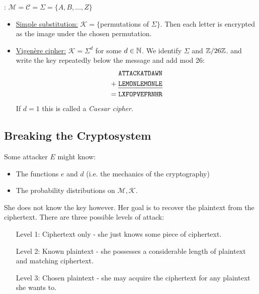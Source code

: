 \documentclass[10pt,a4paper]{article}
\begin{document}
: $\mathcal{M}=\mathcal{C} = \Sigma=\{A, B, \ldots, Z\}$
\begin{itemize}
\item \underline{Simple substitution:} $\mathcal{K} = \{$permutations of $\Sigma\}$. Then each letter is encrypted as the image under the chosen permutation.
\item \underline{Vigen\`{e}re cipher:} $\mathcal{K} = \Sigma^d$ for some $d \in \mathbb{N}$. We identify $\Sigma$ and $\mathbb{Z}/26\mathbb{Z}$. and write the key repeatedly below the message and add mod 26:
\setul{5pt}{.8pt}
\begin{align*}
&\texttt{ATTACKATDAWN}\\
+\;&\ul{\texttt{LEMONLEMONLE}}\\
=\;&\texttt{LXFOPVEFRNHR}
\end{align*}
If $d=1$ this is called a \emph{Caesar cipher}.
\end{itemize}
\subsection{Breaking the Cryptosystem}
Some attacker $E$ might know:
\begin{itemize}
\item The functions $e$ and $d$ (i.e. the mechanics of the cryptography)
\item The probability distributions  on $\mathcal{M}, \mathcal{K}$.
\end{itemize}
She does not know the key however. Her goal is to recover the plaintext from the ciphertext. There are three possible levels of attack:
\begin{itemize}
\item[Level 1:] Ciphertext only - she just knows some piece of ciphertext.
\item[Level 2:] Known plaintext - she possesses a considerable length of plaintext and matching ciphertext.
\item[Level 3:] Chosen plaintext - she may acquire the ciphertext for any plaintext she wants to.
\end{itemize}
\end{document}
